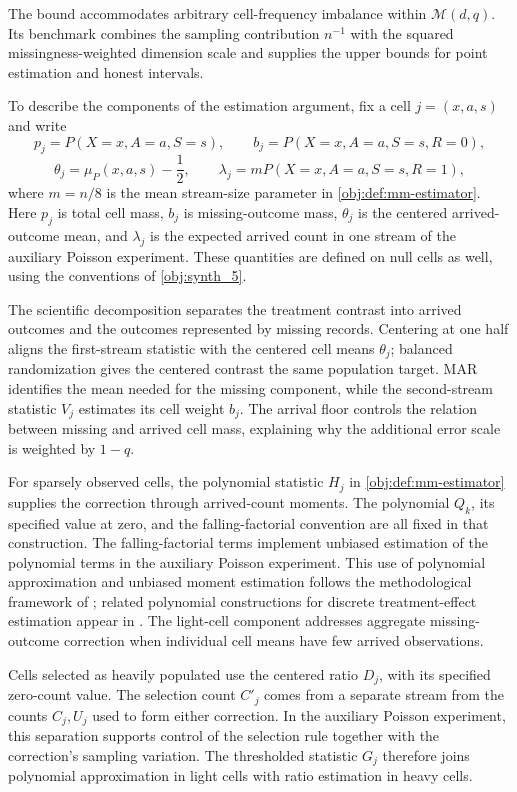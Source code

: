 \documentclass[11pt]{article}
\begin{document}
The bound accommodates arbitrary cell-frequency imbalance within \(\mathcal M(d,q)\). Its benchmark combines the sampling contribution \(n^{-1}\) with the squared missingness-weighted dimension scale and supplies the upper bounds for point estimation and honest intervals.

To describe the components of the estimation argument, fix a cell \(j=(x,a,s)\) and write
\[
p_j=P(X=x,A=a,S=s),\qquad
b_j=P(X=x,A=a,S=s,R=0),
\]
\[
\theta_j=\mu_P(x,a,s)-\frac12,\qquad
\lambda_j=mP(X=x,A=a,S=s,R=1),
\]
where \(m=n/8\) is the mean stream-size parameter in \cref{obj:def:mm-estimator}. Here \(p_j\) is total cell mass, \(b_j\) is missing-outcome mass, \(\theta_j\) is the centered arrived-outcome mean, and \(\lambda_j\) is the expected arrived count in one stream of the auxiliary Poisson experiment. These quantities are defined on null cells as well, using the conventions of \cref{obj:synth_5}.

The scientific decomposition separates the treatment contrast into arrived outcomes and the outcomes represented by missing records. Centering at one half aligns the first-stream statistic with the centered cell means \(\theta_j\); balanced randomization gives the centered contrast the same population target. MAR identifies the mean needed for the missing component, while the second-stream statistic \(V_j\) estimates its cell weight \(b_j\). The arrival floor controls the relation between missing and arrived cell mass, explaining why the additional error scale is weighted by \(1-q\).

For sparsely observed cells, the polynomial statistic \(H_j\) in \cref{obj:def:mm-estimator} supplies the correction through arrived-count moments. The polynomial \(Q_k\), its specified value at zero, and the falling-factorial convention are all fixed in that construction. The falling-factorial terms implement unbiased estimation of the polynomial terms in the auxiliary Poisson experiment. This use of polynomial approximation and unbiased moment estimation follows the methodological framework of \citet[Sections~III--IV]{JiaoVenkatHanWeissman2015}; related polynomial constructions for discrete treatment-effect estimation appear in \citet{CausalSmith2026,CausalSmith2026Annotation}. The light-cell component addresses aggregate missing-outcome correction when individual cell means have few arrived observations.

Cells selected as heavily populated use the centered ratio \(D_j\), with its specified zero-count value. The selection count \(C'_j\) comes from a separate stream from the counts \(C_j,U_j\) used to form either correction. In the auxiliary Poisson experiment, this separation supports control of the selection rule together with the correction's sampling variation. The thresholded statistic \(G_j\) therefore joins polynomial approximation in light cells with ratio estimation in heavy cells.
\end{document}
